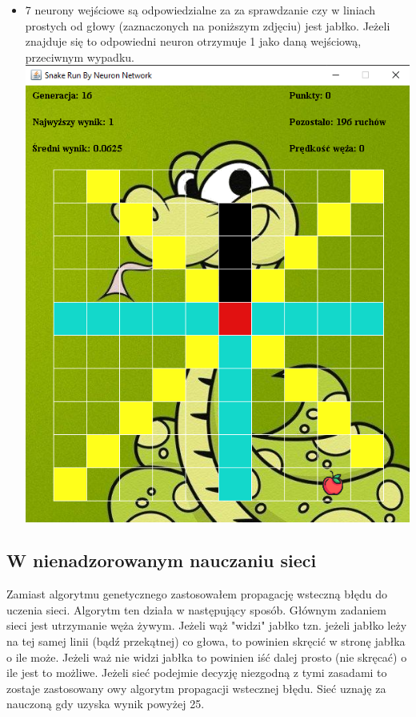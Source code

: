 \documentclass{article}
\begin{document}
\begin{itemize}
            \item 7 neurony wejściowe są odpowiedzialne za za sprawdzanie czy w liniach prostych od głowy (zaznaczonych na poniższym zdjęciu) jest jabłko. Jeżeli znajduje się to odpowiedni neuron otrzymuje 1 jako daną wejściową, przeciwnym wypadku.\\ \includegraphics[scale = 2]{apple}
        \end{itemize}
    \subsection{W nienadzorowanym nauczaniu sieci}
        Zamiast algorytmu genetycznego zastosowałem propagację wsteczną błędu do uczenia sieci. Algorytm ten działa w następujący sposób. Głównym zadaniem sieci jest utrzymanie węża żywym. Jeżeli wąż "widzi" jabłko tzn. jeżeli jabłko leży na tej samej linii (bądź przekątnej) co głowa, to powinien skręcić w stronę jabłka o ile może. Jeżeli waż nie widzi jabłka to powinien iść dalej prosto (nie skręcać) o ile jest to możliwe. Jeżeli sieć podejmie decyzję niezgodną z tymi zasadami to zostaje zastosowany owy algorytm propagacji wstecznej błędu. Sieć uznaję za nauczoną gdy uzyska wynik powyżej 25. 
\newpage
\end{document}
